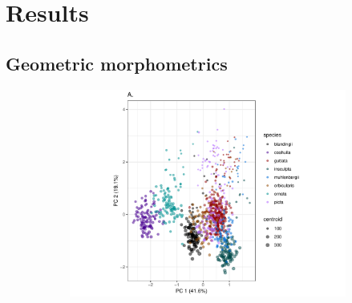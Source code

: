 \documentclass[fleqn,10pt,lineno]{wlpeerj} %
\begin{document}
\section*{Results}

\subsection*{Geometric morphometrics}


\begin{figure}[h]
  \centering
  \begin{subfigure}[b]{0.7\textwidth}
    \caption{}
    \includegraphics[width = \textwidth]{figure/cc7_pc_graph}
  \end{subfigure}


\end{figure}
\end{document}
